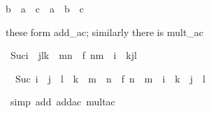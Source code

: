 \begin{isabellebody}
\begin{isamarkuptext}
\begin{isabelle}%
b\ {}\ {}a\ {}\ c{}\ {}\ a\ {}\ {}b\ {}\ c{}%
\end{isabelle}

these form add_ac; similarly there is mult_ac%
\end{isamarkuptext}%
\isamarkuptrue%
\isamarkupfalse%
\ {}Suc{}i\ {}\ j{}l{}k\ {}\ m{}n{}\ {}\ f\ {}n{}m\ {}\ i\ {}\ k{}j{}l{}{}%
\isadelimproof
%
\endisadelimproof
%
\isatagproof
%
\begin{isamarkuptxt}%
\begin{isabelle}%
\ {}{}\ Suc\ {}i\ {}\ j\ {}\ l\ {}\ k\ {}\ m\ {}\ n{}\ {}\ f\ {}n\ {}\ m\ {}\ i\ {}\ k\ {}\ j\ {}\ l{}%
\end{isabelle}%
\end{isamarkuptxt}%
\isamarkuptrue%
\isamarkupfalse%
\ {}simp\ add{}\ add{}ac\ mult{}ac{}%
\begin{isamarkuptxt}%
\begin{isabelle}%

\end{isabelle}
\end{isamarkuptxt}
\end{isabellebody}
